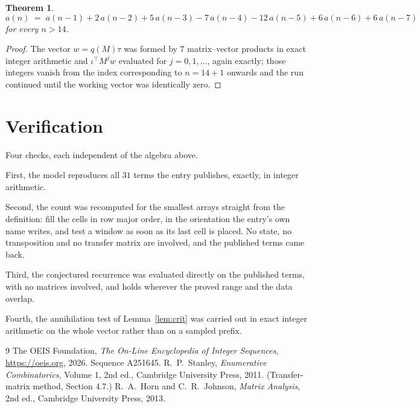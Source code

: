 \documentclass[11pt,a4paper]{article}
\theoremstyle{plain}
\newtheorem{theorem}{Theorem}
\theoremstyle{definition}
\begin{document}
\begin{theorem}
\[
a(n)\;=\;a(n-1) + 2\,a(n-2) + 5\,a(n-3) - 7\,a(n-4) - 12\,a(n-5) + 6\,a(n-6) + 6\,a(n-7)
\]
for every $n>14$.
\end{theorem}

\begin{proof}
The vector $w=q(M)\tau$ was formed by $7$ matrix--vector products in exact integer
arithmetic and $\iota^{\!\top}M^{j}w$ evaluated for $j=0,1,\dots$, again exactly; those
integers vanish from the index corresponding to $n=14+1$ onwards and the run continued
until the working vector was identically zero.
\end{proof}

\section{Verification}

Four checks, each independent of the algebra above.

First, the model reproduces all $31$ terms the entry publishes, exactly, in integer
arithmetic.

Second, the count was recomputed for the smallest arrays straight from the definition: fill the
cells in row major order, in the orientation the entry's own name writes, and test a window as
soon as its last cell is placed. No state, no transposition and no transfer matrix are
involved, and the published terms came back.

Third, the conjectured recurrence was evaluated directly on the published terms, with no
matrices involved, and holds wherever the proved range and the data overlap.

Fourth, the annihilation test of Lemma~\ref{lem:crit} was carried out in exact integer
arithmetic on the whole vector rather than on a sampled prefix.

\begin{thebibliography}{9}
 The OEIS Foundation, \emph{The On-Line Encyclopedia of Integer
Sequences}, \url{https://oeis.org}, 2026. Sequence A251645.
 R.~P.~Stanley, \emph{Enumerative Combinatorics}, Volume 1, 2nd ed.,
Cambridge University Press, 2011. (Transfer-matrix method, Section 4.7.)
 R.~A.~Horn and C.~R.~Johnson, \emph{Matrix Analysis}, 2nd ed., Cambridge
University Press, 2013.
\end{thebibliography}
\end{document}
